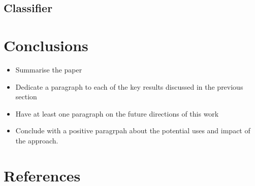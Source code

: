 \documentclass[12pt]{iopart}
\begin{document}
\subsection{Classifier}


\section{Conclusions}

\begin{itemize}
\item Summarise the paper
\item Dedicate a paragraph to each of the key results discussed in the previous
section
\item Have at least one paragraph on the future directions of this work
\item Conclude with a positive paragrpah about the potential uses and impact of
the approach.
\end{itemize}

\section*{References}


\clearpage

\appendix
\end{document}
